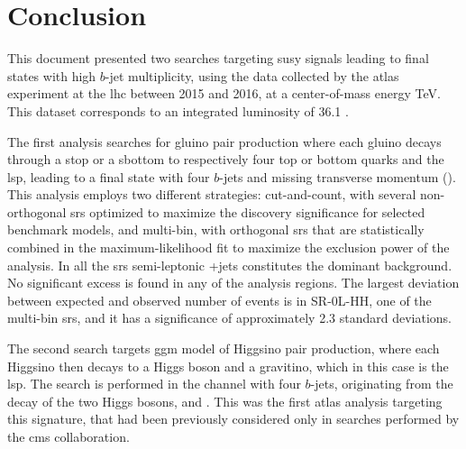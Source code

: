 \chapter*{Conclusion}

This document presented two searches targeting \gls{susy} signals leading to final states with 
high $b$-jet multiplicity, using the data collected by the \gls{atlas} experiment at the \gls{lhc} 
between 2015 and 2016, at a center-of-mass energy  \cmtre TeV. 
This dataset corresponds to an integrated luminosity of 36.1 \ifb.

The first analysis searches for gluino pair production where each gluino decays through a stop or a sbottom 
to respectively four top or bottom quarks and the \gls{lsp}, leading to a final state with four $b$-jets and 
missing transverse momentum (\met). 
This analysis employs two different strategies: cut-and-count, with several non-orthogonal \glspl{sr} optimized to 
maximize the discovery significance for selected benchmark models, and multi-bin, with orthogonal \glspl{sr} 
that are statistically combined in the maximum-likelihood fit 
to maximize the exclusion power of the analysis. 
In all the \glspl{sr} semi-leptonic \ttbar+jets constitutes the dominant background.
No significant excess is found in any of the analysis regions. 
The largest deviation between expected and observed number of events 
is in SR-0L-HH, one of the multi-bin \glspl{sr}, and it has a significance of approximately 
2.3 standard deviations. 




The second search targets \gls{ggm} model of Higgsino pair production, where each Higgsino then decays to a Higgs boson and 
a gravitino, which in this case is the \gls{lsp}. The search is performed in the channel with four $b$-jets, originating from 
the decay of the two Higgs bosons, and \met. 
This was the first \gls{atlas} analysis targeting this signature, that had been 
previously considered only in searches performed by the \gls{cms} collaboration.






